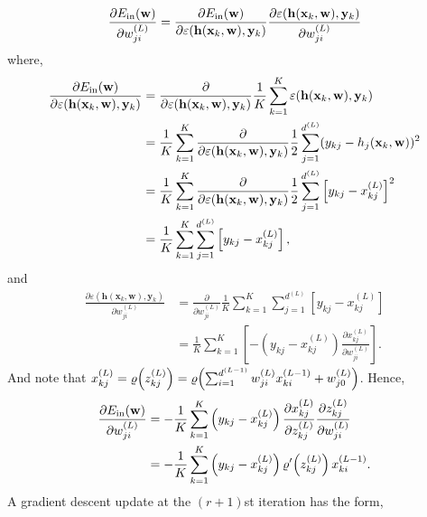 \begin{equation}
\frac{\partial E_{\mathrm{in}}(\mathbf{w})}{\partial w_{ji}^{(L)}}=\frac{\partial E_{\mathrm{in}}(\mathbf{w})}{\partial \varepsilon(\mathbf{h}(\mathbf{x}_k,\mathbf{w}),\mathbf{y}_{k})}\frac{\partial \varepsilon(\mathbf{h}(\mathbf{x}_k,\mathbf{w}),\mathbf{y}_{k})}{\partial w_{ji}^{(L)}}
\end{equation}
where,
\begin{align}
\frac{\partial E_{\mathrm{in}}(\mathbf{w})}{\partial \varepsilon(\mathbf{h}(\mathbf{x}_k,\mathbf{w}),\mathbf{y}_{k})}&=\frac{\partial}{\partial \varepsilon(\mathbf{h}(\mathbf{x}_k,\mathbf{w}),\mathbf{y}_{k})}\frac{1}{K}\sum_{k=1}^{K}\varepsilon(\mathbf{h}(\mathbf{x}_k,\mathbf{w}),\mathbf{y}_k)\nonumber\\
&=\frac{1}{K}\sum_{k=1}^{K}\frac{\partial}{\partial \varepsilon(\mathbf{h}(\mathbf{x}_k,\mathbf{w}),\mathbf{y}_{k})}\frac{1}{2}\sum_{j=1}^{d^{(L)}}(y_{kj}-h_j(\mathbf{x}_k,\mathbf{w}))^2\nonumber\\
&=\frac{1}{K}\sum_{k=1}^{K}\frac{\partial}{\partial \varepsilon(\mathbf{h}(\mathbf{x}_k,\mathbf{w}),\mathbf{y}_{k})}\frac{1}{2}\sum_{j=1}^{d^{(L)}}\left[y_{kj}-x_{kj}^{(L)}\right]^2\nonumber\\
&=\frac{1}{K}\sum_{k=1}^{K}\sum_{j=1}^{d^{(L)}}\left[y_{kj}-x_{kj}^{(L)}\right],\label{eq:err}
\end{align}
and
\begin{align}
\frac{\partial \varepsilon(\mathbf{h}(\mathbf{x}_k,\mathbf{w}),\mathbf{y}_{k})}{\partial w_{ji}^{(L)}}&=\frac{\partial}{\partial w_{ji}^{(L)}}\frac{1}{K}\sum_{k=1}^{K}\sum_{j=1}^{d^{(L)}}\left[y_{kj}-x_{kj}^{(L)}\right]\nonumber\\
&=\frac{1}{K}\sum_{k=1}^{K}\left[-\left(y_{kj}-x_{kj}^{(L)}\right)\frac{\partial x_{kj}^{(L)}}{\partial w_{ji}^{(L)}}\right].\label{eq:inerr}
\end{align}
And note that $x_{kj}^{(L)}=\varrho\!\left(z_{kj}^{(L)}\right)=\varrho\!\left(\sum_{i=1}^{d^{(L-1)}}w_{ji}^{(L)}x_{ki}^{(L-1)}+w_{j0}^{(L)}\right)$. Hence,
\begin{align}
\frac{\partial E_{\mathrm{in}}(\mathbf{w})}{\partial w_{ji}^{(L)}}&=-\frac{1}{K}\sum_{k=1}^{K}\left(y_{kj}-x_{kj}^{(L)}\right)\frac{\partial x_{kj}^{(L)}}{\partial z_{kj}^{(L)}}\frac{\partial z_{kj}^{(L)}}{\partial w_{ji}^{(L)}}\nonumber\\
&=-\frac{1}{K}\sum_{k=1}^{K}\left(y_{kj}-x_{kj}^{(L)}\right)\varrho'\!\left(z_{kj}^{(L)}\right)x_{ki}^{(L-1)}.\label{eq:grad1}
\end{align}
A gradient descent update at the $(r+1)$st iteration has the form,
